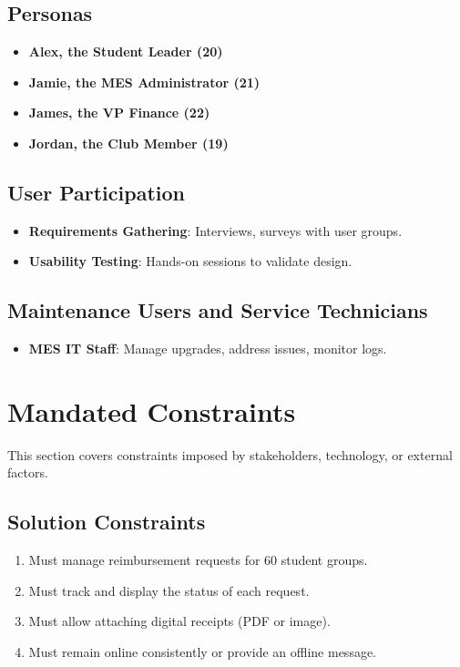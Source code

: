 \documentclass[12pt]{article}
\begin{document}
\subsection{Personas}
\begin{itemize}
    \item \textbf{Alex, the Student Leader (20)}
    \item \textbf{Jamie, the MES Administrator (21)}
    \item \textbf{James, the VP Finance (22)}
    \item \textbf{Jordan, the Club Member (19)}
\end{itemize}

\subsection{User Participation}
\begin{itemize}
    \item \textbf{Requirements Gathering}: Interviews, surveys with user groups.
    \item \textbf{Usability Testing}: Hands-on sessions to validate design.
\end{itemize}

\subsection{Maintenance Users and Service Technicians}
\begin{itemize}
    \item \textbf{MES IT Staff}: Manage upgrades, address issues, monitor logs.
\end{itemize}

\section{Mandated Constraints}
This section covers constraints imposed by stakeholders, technology, or external factors.

\subsection{Solution Constraints}
\begin{enumerate}
  \item Must manage reimbursement requests for 60 student groups.
  \item Must track and display the status of each request.
  \item Must allow attaching digital receipts (PDF or image).
  \item Must remain online consistently or provide an offline message.
\end{enumerate}
\end{document}
